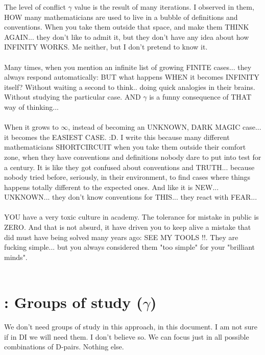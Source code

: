 		\noindent
		The level of conflict $\gamma$ value is the result of many iterations. I observed in them, HOW many mathematicians are used to live in a bubble of definitions and conventions. When you take them outside that space, and make them THINK AGAIN... they don't like to admit it, but they don't have any idea about how INFINITY WORKS. Me neither, but I don't pretend to know it.
		\\\\
		
		\noindent
		Many times, when you mention an infinite list of growing FINITE cases... they always respond automatically: BUT what happens WHEN it becomes INFINITY itself? Without waiting a second to think.. doing quick analogies in their brains. Without studying the particular case. AND $\gamma$ is a funny consequence of THAT way of thinking...
		\\\\
		
		\noindent
		When it grows to $\infty$, instead of becoming an UNKNOWN, DARK MAGIC case... it becomes the EASIEST CASE. :D. I write this because many different mathematicians SHORTCIRCUIT when you take them outside their comfort zone, when they have conventions and definitions nobody dare to put into test for a century. It is like they got confused about conventions and TRUTH... because nobody tried before, seriously, in their environment, to find cases where things happens totally different to the expected ones. And like it is NEW... UNKNOWN... they don't know conventions for THIS... they react with FEAR...
		\\\\
		
		\noindent
		YOU have a very toxic culture in academy. The tolerance for mistake in public is ZERO. And that is not absurd, it have driven you to keep alive a mistake that did must have being solved many years ago: SEE MY TOOLS !!. They are fucking simple... but you always considered them "too simple" for your "brilliant minds".
		\\\\
		
		
	\section{\:: Groups of study ($\gamma$)}
	
		\noindent
		We don't need groups of study in this approach, in this document. I am not sure if in DI we will need them. I don't believe so. We can focus just in all possible combinations of D-pairs. Nothing else.
		\\\\
		
